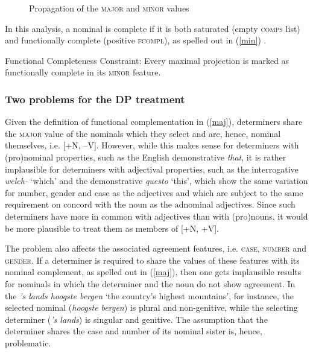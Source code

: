\documentclass[output=paper
	        ,collection
	        ,collectionchapter
 	        ,biblatex
                ,babelshorthands
                ,newtxmath
                ,draftmode
                ,colorlinks, citecolor=brown
]{langscibook}
\begin{document}
\begin{figure}
\caption{\label{netter} Propagation of the \textsc{major} and \textsc{minor} values}
\end{figure}

In this analysis, a nominal is complete if it is both saturated 
(empty \textsc{comps} list) and functionally complete (positive \textsc{fcompl}), as 
spelled out in (\ref{min}) \citep[312]{Netter94}.

\begin{exe} 
\ex\label{min} Functional Completeness Constraint: Every maximal projection is marked  
      as functionally complete in its \textsc{minor} feature. 
\end{exe}



\subsubsection{Two problems for the DP treatment}  
\label{prob}


Given the definition of functional complementation in (\ref{maj}), 
determiners share the \textsc{major} value of the nominals which they select
and are, hence, nominal themselves, i.e. [+N, --V].
However, while this makes sense for determiners with (pro)nominal properties,
such as the English demonstrative \emph{that}, 
it is rather implausible for determiners with adjectival properties,
such as the  interrogative \emph{welch-} `which' and 
the  demonstrative \emph{questo} `this', which show the same variation for 
number, gender and case as the adjectives and which are subject to 
the same requirement on concord with the noun as the adnominal adjectives. 
Since such determiners have more in common with adjectives than with (pro)nouns,  
it would be more plausible to treat them as members of [+N, +V].  

The problem also affects the associated agreement features, i.e. \textsc{case}, 
\textsc{number} and \textsc{gender}. If a determiner 
is required to share the values of these features with its nominal complement,
as spelled out in (\ref{maj}), then one gets implausible results for nominals in 
which the determiner and the noun do not show agreement.    
In the  \emph{'s lands hoogste bergen} `the country's highest mountains', 
for instance, the selected nominal (\emph{hoogste bergen}) is plural and non-genitive, 
while the selecting determiner (\emph{'s lands}) is singular and genitive.  
The assumption that the determiner shares the case and number of its nominal sister 
is, hence, problematic.
\end{document}
